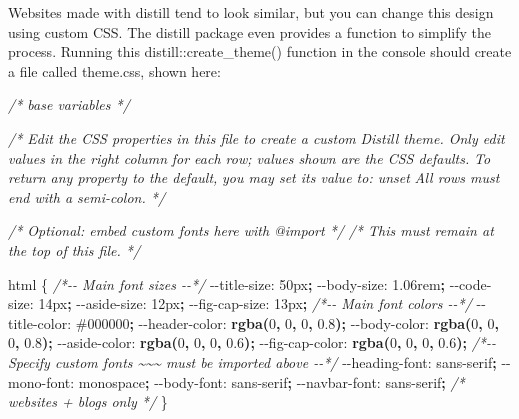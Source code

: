 \documentclass[
]{book}
\newenvironment{Shaded}{\begin{snugshade}}{\end{snugshade}}
\newcommand{\CommentTok}[1]{\textcolor[rgb]{0.56,0.35,0.01}{\textit{#1}}}
\newcommand{\ConstantTok}[1]{\textcolor[rgb]{0.56,0.35,0.01}{#1}}
\newcommand{\DataTypeTok}[1]{\textcolor[rgb]{0.13,0.29,0.53}{#1}}
\newcommand{\DecValTok}[1]{\textcolor[rgb]{0.00,0.00,0.81}{#1}}
\newcommand{\FunctionTok}[1]{\textcolor[rgb]{0.13,0.29,0.53}{\textbf{#1}}}
\newcommand{\NormalTok}[1]{#1}
\newcommand{\OperatorTok}[1]{\textcolor[rgb]{0.81,0.36,0.00}{\textbf{#1}}}
\newcommand{\VariableTok}[1]{\textcolor[rgb]{0.00,0.00,0.00}{#1}}
\begin{document}
Websites made with distill tend to look similar, but you can change this design using custom CSS. The distill package even provides a function to simplify the process. Running this distill::create\_theme() function in the console should create a file called theme.css, shown here:

\begin{Shaded}
\begin{Highlighting}[]
\CommentTok{/* base variables */}

\CommentTok{/* Edit the CSS properties in this file to create a custom}
\CommentTok{   Distill theme. Only edit values in the right column}
\CommentTok{   for each row; values shown are the CSS defaults.}
\CommentTok{   To return any property to the default,}
\CommentTok{   you may set its value to: unset}
\CommentTok{   All rows must end with a semi{-}colon.                      */}

\CommentTok{/* Optional: embed custom fonts here with \textasciigrave{}@import\textasciigrave{}          */}
\CommentTok{/* This must remain at the top of this file.                 */}

\NormalTok{html \{}
  \CommentTok{/*{-}{-} Main font sizes {-}{-}*/}
  \VariableTok{{-}{-}title{-}size}\NormalTok{:      }\DecValTok{50}\DataTypeTok{px}\OperatorTok{;}
  \VariableTok{{-}{-}body{-}size}\NormalTok{:       }\DecValTok{1.06}\DataTypeTok{rem}\OperatorTok{;}
  \VariableTok{{-}{-}code{-}size}\NormalTok{:       }\DecValTok{14}\DataTypeTok{px}\OperatorTok{;}
  \VariableTok{{-}{-}aside{-}size}\NormalTok{:      }\DecValTok{12}\DataTypeTok{px}\OperatorTok{;}
  \VariableTok{{-}{-}fig{-}cap{-}size}\NormalTok{:    }\DecValTok{13}\DataTypeTok{px}\OperatorTok{;}
  \CommentTok{/*{-}{-} Main font colors {-}{-}*/}
  \VariableTok{{-}{-}title{-}color}\NormalTok{:     }\ConstantTok{\#000000}\OperatorTok{;}
  \VariableTok{{-}{-}header{-}color}\NormalTok{:    }\FunctionTok{rgba(}\DecValTok{0}\OperatorTok{,} \DecValTok{0}\OperatorTok{,} \DecValTok{0}\OperatorTok{,} \DecValTok{0.8}\FunctionTok{)}\OperatorTok{;}
  \VariableTok{{-}{-}body{-}color}\NormalTok{:      }\FunctionTok{rgba(}\DecValTok{0}\OperatorTok{,} \DecValTok{0}\OperatorTok{,} \DecValTok{0}\OperatorTok{,} \DecValTok{0.8}\FunctionTok{)}\OperatorTok{;}
  \VariableTok{{-}{-}aside{-}color}\NormalTok{:     }\FunctionTok{rgba(}\DecValTok{0}\OperatorTok{,} \DecValTok{0}\OperatorTok{,} \DecValTok{0}\OperatorTok{,} \DecValTok{0.6}\FunctionTok{)}\OperatorTok{;}
  \VariableTok{{-}{-}fig{-}cap{-}color}\NormalTok{:   }\FunctionTok{rgba(}\DecValTok{0}\OperatorTok{,} \DecValTok{0}\OperatorTok{,} \DecValTok{0}\OperatorTok{,} \DecValTok{0.6}\FunctionTok{)}\OperatorTok{;}
  \CommentTok{/*{-}{-} Specify custom fonts \textasciitilde{}\textasciitilde{}\textasciitilde{} must be imported above   {-}{-}*/}
  \VariableTok{{-}{-}heading{-}font}\NormalTok{:    }\DecValTok{sans{-}serif}\OperatorTok{;}
  \VariableTok{{-}{-}mono{-}font}\NormalTok{:       }\DecValTok{monospace}\OperatorTok{;}
  \VariableTok{{-}{-}body{-}font}\NormalTok{:       }\DecValTok{sans{-}serif}\OperatorTok{;}
  \VariableTok{{-}{-}navbar{-}font}\NormalTok{:     }\DecValTok{sans{-}serif}\OperatorTok{;}  \CommentTok{/* websites + blogs only */}
\NormalTok{\}}


\end{Highlighting}
\end{Shaded}
\end{document}
